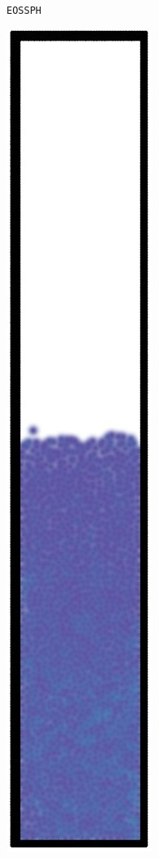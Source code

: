 \begin{figure}[h]
\begin{subfigure}[t]{0.1\textwidth}
    \caption{\small{\texttt{EOSSPH}}}
  \end{subfigure}
  \hspace*{0.1\textwidth}
  \begin{subfigure}[t]{0.1\textwidth}
    \centering
    \includegraphics*[width=\textwidth]{images/stability/split.jpg}

\end{subfigure}
\end{figure}
